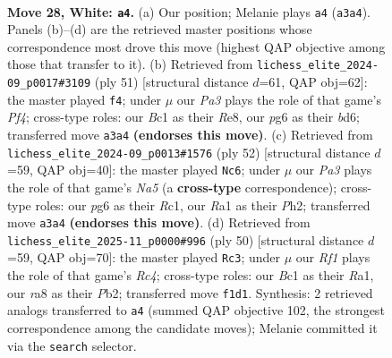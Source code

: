 \documentclass[11pt]{article}
\begin{document}
\clearpage

\begin{figure}[p]\centering
\begin{subfigure}{0.46\textwidth}\centering
\resizebox{\linewidth}{!}{%
\newchessgame
\chessboard[
  setfen={rn3r2/1p1kbb1p/6pP/p2pPp2/3N4/P5P1/6K1/RNB2R2 w - - 2 28},
  showmover=false,
  pgfstyle=straightmove, color=movearrow, markmove={a3-a4}
]}
\caption{}
\end{subfigure}\hfill
\begin{subfigure}{0.46\textwidth}\centering
\resizebox{\linewidth}{!}{%
\newchessgame
\chessboard[
  setfen={2r1r1k1/p2n3p/3B1b2/N1PR1pp1/4p3/7P/P3KPP1/2R5 b - - 0 26},
  showmover=false,
  pgfstyle=straightmove, color=movearrow, markmove={f5-f4}
]}
\caption{}
\end{subfigure}
\\[4pt]
\begin{subfigure}{0.46\textwidth}\centering
\resizebox{\linewidth}{!}{%
\newchessgame
\chessboard[
  setfen={1r4k1/7p/p7/N3rbp1/1n2pp2/1P6/P4PPP/2R1RBK1 w - - 3 27},
  showmover=false,
  pgfstyle=straightmove, color=movearrow, markmove={a5-c6}
]}
\caption{}
\end{subfigure}\hfill
\begin{subfigure}{0.46\textwidth}\centering
\resizebox{\linewidth}{!}{%
\newchessgame
\chessboard[
  setfen={r1rn4/4k1pp/p1p2p2/P3pb2/1NR5/1B2P3/1PP3PP/R5K1 w - - 2 26},
  showmover=false,
  pgfstyle=straightmove, color=movearrow, markmove={c4-c3}
]}
\caption{}
\end{subfigure}
\caption{\textbf{Move 28, White: \texttt{a4}.} (a) Our position; Melanie plays \texttt{a4} (\texttt{a3a4}). Panels (b)--(d) are the retrieved master positions whose correspondence most drove this move (highest QAP objective among those that transfer to it). (b) Retrieved from \texttt{lichess\_elite\_2024-09\_p0017\#3109} (ply 51) [structural distance $d$=61, QAP obj=62]: the master played \texttt{f4}; under $\mu$ our \emph{Pa3} plays the role of that game's \emph{Pf4}; cross-type roles: our \emph{B}c1 as their \emph{R}e8, our \emph{p}g6 as their \emph{b}d6; transferred move \texttt{a3a4} \textbf{(endorses this move)}. (c) Retrieved from \texttt{lichess\_elite\_2024-09\_p0013\#1576} (ply 52) [structural distance $d$=59, QAP obj=40]: the master played \texttt{Nc6}; under $\mu$ our \emph{Pa3} plays the role of that game's \emph{Na5} (a \textbf{cross-type} correspondence); cross-type roles: our \emph{p}g6 as their \emph{R}c1, our \emph{R}a1 as their \emph{P}h2; transferred move \texttt{a3a4} \textbf{(endorses this move)}. (d) Retrieved from \texttt{lichess\_elite\_2025-11\_p0000\#996} (ply 50) [structural distance $d$=59, QAP obj=70]: the master played \texttt{Rc3}; under $\mu$ our \emph{Rf1} plays the role of that game's \emph{Rc4}; cross-type roles: our \emph{B}c1 as their \emph{R}a1, our \emph{r}a8 as their \emph{P}b2; transferred move \texttt{f1d1}. Synthesis: 2 retrieved analogs transferred to \texttt{a4} (summed QAP objective 102, the strongest correspondence among the candidate moves); Melanie committed it via the \texttt{search} selector.}
\label{fig:thought-m54}
\end{figure}
\end{document}
